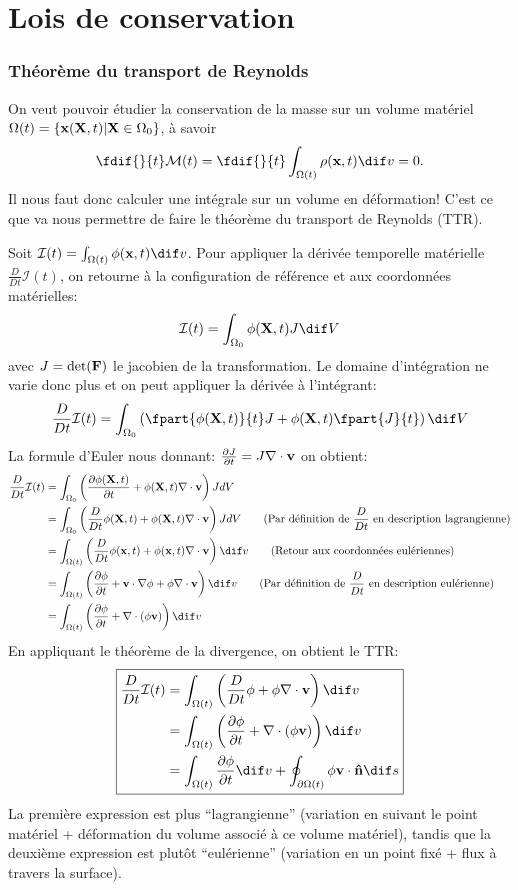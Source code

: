 \part{Lois de conservation}
\section{Théorème du transport de Reynolds}
On veut pouvoir étudier la conservation de la masse sur un volume matériel
$\Omega (t)=\{\textbf{x}(\textbf{X},t)|\textbf{X}\in \Omega_0\}$,
à savoir
$$\fdif{}{t}\mathcal{M}(t)=\fdif{}{t}\int_{\Omega (t)}\rho(\fv{x},t) \dif v=0.$$
Il nous faut donc calculer une intégrale sur un volume en déformation!
C'est ce que va nous permettre de faire le théorème du transport de Reynolds (TTR).

Soit $\mathcal{I}(t)=\int_{\Omega (t)}\phi(\fv{x},t) \dif v$.
Pour appliquer la dérivée temporelle matérielle $\frac{D}{Dt}\mathcal{I}(t)$,
on retourne à la configuration de référence et aux coordonnées matérielles:
$$\mathcal{I}(t)=\int_{\Omega_0}\phi(\fv{X},t) J \dif V$$
avec $J=\det(\textbf{F})$ le jacobien de la transformation.
Le domaine d'intégration ne varie donc plus et on peut appliquer la dérivée à l'intégrant:
$$\frac{D}{Dt}\mathcal{I}(t)=\int_{\Omega_0}\left(\fpart{\phi(\fv{X},t)}{t}J
+\phi(\fv{X},t)\fpart{J}{t}\right) \dif V$$
La formule d'Euler nous donnant: $\frac{\partial J}{\partial t}=J\nabla\cdot\textbf{v}$ on obtient:
$$\begin{aligned}
\frac{D}{Dt}\mathcal{I}(t)&=\int_{\Omega_0}\left(\frac{\partial \phi(\fv{X},t)}{\partial t}+\phi(\fv{X},t)\nabla\cdot\fv{v}\right)JdV\\
 &=\int_{\Omega_0}\left(\frac{D}{Dt}\phi(\fv{X},t)+\phi(\fv{X},t)\nabla\cdot\fv{v}\right)JdV \qquad\text{(Par définition de } \frac{D}{Dt}\text{ en description lagrangienne)}\\
 &=\int_{\Omega (t)}\left(\frac{D}{Dt}\phi(\fv{x},t)+\phi(\fv{x},t)\nabla\cdot\fv{v}\right) \dif v\qquad\text{(Retour aux coordonnées eulériennes) }\\
 &=\int_{\Omega (t)}\left(\frac{\partial\phi}{\partial t}+\fv{v}\cdot\nabla\phi+\phi\nabla\cdot\fv{v}\right) \dif v\qquad\text{(Par définition de } \frac{D}{Dt}\text{ en description eulérienne)}\\
 &=\int_{\Omega (t)}\left(\frac{\partial\phi}{\partial t}+\nabla\cdot(\phi\fv{v})\right) \dif v
\end{aligned}$$
En appliquant le théorème de la divergence, on obtient le TTR:
$$\boxed{
\begin{aligned}
\frac{D}{Dt}\mathcal{I}(t) &=\int_{\Omega (t)}\left(\frac{D}{Dt}\phi+\phi\nabla\cdot\fv{v}\right) \dif v\qquad\\
 & =\int_{\Omega (t)}\left(\frac{\partial \phi}{\partial t}+\nabla\cdot(\phi\fv{v})\right) \dif v\\
 & = \int_{\Omega (t)}\frac{\partial\phi}{\partial t} \dif v+\oint_{\partial \Omega (t)}\phi\fv{v}\cdot\fv{\^n} \dif s\\
\end{aligned}}$$
La première expression est plus ``lagrangienne'' (variation en suivant le point matériel + déformation du volume associé à ce volume matériel), tandis que la deuxième expression est plutôt ``eulérienne'' (variation en un point fixé + flux à travers la surface).
